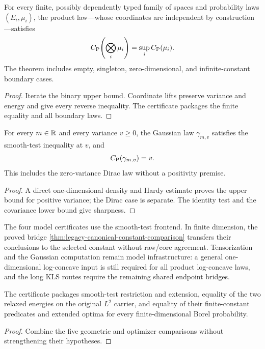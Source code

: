 \begin{theorem}
  \label{cert:finite-tensorization}
  \leanok
  For every finite, possibly dependently typed family of spaces and probability laws
  $(E_i,\mu_i)$, the product law---whose coordinates are independent by construction---satisfies
  \[
    C_{\mathrm P}\!\left(\bigotimes_i\mu_i\right)=\sup_iC_{\mathrm P}(\mu_i).
  \]
  The theorem includes empty, singleton, zero-dimensional, and infinite-constant boundary cases.
\end{theorem}
\begin{proof}
  \leanok
  Iterate the binary upper bound.  Coordinate lifts preserve variance and energy and give every
  reverse inequality.  The certificate packages the finite equality and all boundary laws.
\end{proof}

\begin{theorem}
  \label{cert:gaussian-one-dimensional}
  \leanok
  For every $m\in\mathbb{R}$ and every variance $v\ge0$, the Gaussian law
  $\gamma_{m,v}$ satisfies the smooth-test inequality at $v$, and
  \[
    C_{\mathrm P}(\gamma_{m,v})=v.
  \]
  This includes the zero-variance Dirac law without a positivity premise.
\end{theorem}
\begin{proof}
  \leanok
  A direct one-dimensional density and Hardy estimate proves the upper bound for positive
  variance; the Dirac case is separate.  The identity test and the covariance lower bound give
  sharpness.
\end{proof}

The four model certificates use the smooth-test frontend. In finite dimension, the proved bridge
\cref{thm:legacy-canonical-constant-comparison} transfers their conclusions to the selected
constant without raw/core agreement. Tensorization and the Gaussian computation remain model
infrastructure: a general one-dimensional log-concave input is still required for all product
log-concave laws, and the long KLS routes require the remaining shared endpoint bridges.


\begin{theorem}
  \label{cert:ambient-intrinsic-comparison}
  \leanok
  The certificate packages smooth-test restriction and extension, equality of the two relaxed
  energies on the original $L^2$ carrier, and equality of their finite-constant predicates and
  extended optima for every finite-dimensional Borel probability.
\end{theorem}
\begin{proof}
  \leanok
  Combine the five geometric and optimizer comparisons without strengthening their hypotheses.
\end{proof}

